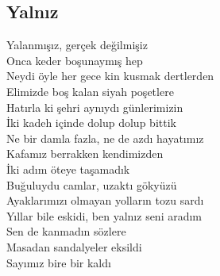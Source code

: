 \subsection{Yalnız}

Yalanmışız, gerçek değilmişiz \\
Onca keder boşunaymış hep \\
Neydi öyle her gece kin kusmak dertlerden \\
Elimizde boş kalan siyah poşetlere \\
Hatırla ki şehri aynıydı günlerimizin \\
İki kadeh içinde dolup dolup bittik \\
Ne bir damla fazla, ne de azdı hayatımız \\
Kafamız berrakken kendimizden \\
İki adım öteye taşamadık \\
Buğuluydu camlar, uzaktı gökyüzü \\
Ayaklarımızı olmayan yolların tozu sardı \\
Yıllar bile eskidi, ben yalnız seni aradım \\
Sen de kanmadın sözlere \\
Masadan sandalyeler eksildi \\
Sayımız bire bir kaldı \\